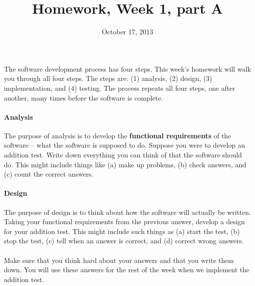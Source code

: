 \documentclass{article}
\title{Homework, Week 1, part A}
\date{October 17, 2013}
\begin{document}
\maketitle{}

\paragraph{}The software development process has four steps. This week's homework will walk you through all four steps. The steps are: (1) analysis, (2) design, (3) implementation, and (4) testing. The process repeats all four steps, one after another, many times before the software is complete.

\paragraph{Analysis}The purpose of analysis is to develop the \textbf{functional requirements} of the software -- what the software is supposed to do. Suppose you were to develop an addition test. Write down everything you can think of that the software should do. This might include things like (a) make up problems, (b) check answers, and (c) count the correct answers.

\paragraph{Design}The purpose of design is to think about how the software will actually be written. Taking your functional requirements from the previous answer, develop a design for your addition test. This might include such things as (a) start the test, (b) stop the test, (c) tell when an answer is correct, and (d) correct wrong answers.

\paragraph{}Make sure that you think hard about your answers and that you write them down. You will use these answers for the rest of the week when we implement the addition test.

%
%
%
%
%
\end{document}
